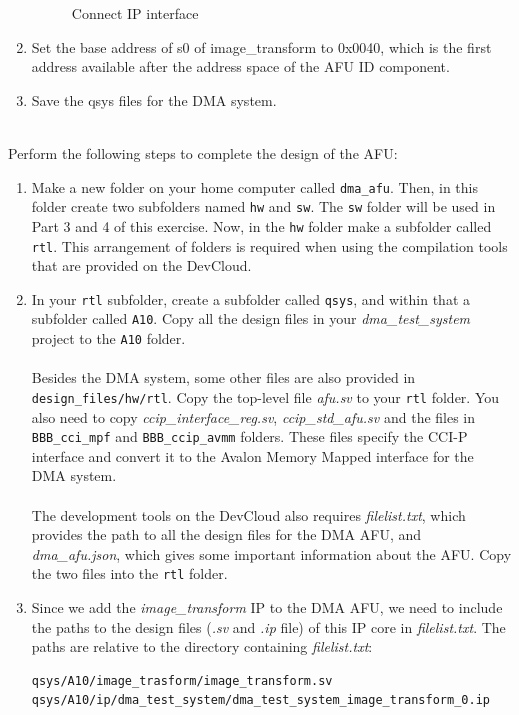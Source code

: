 \documentclass[epsfig,10pt,fullpage]{article}
\begin{document}
\begin{enumerate}
\begin{figure}
            \caption{Connect IP interface}
            \label{fig:ip_connect}
        \end{figure}
    \item Set the base address of s0 of image\_transform to 0x0040, which is the first address available after the address space of the AFU ID component. 
    \item Save the qsys files for the DMA system.
\end{enumerate}

~\\
\noindent
Perform the following steps to complete the design of the AFU:

\begin{enumerate}
\item
Make a new folder on your home computer called \texttt{dma\_afu}. Then, in this folder create two subfolders named \texttt{hw} and \texttt{sw}. The \texttt{sw} folder will be used in Part 3 and 4 of this exercise. Now, in the \texttt{hw} folder make a subfolder called \texttt{rtl}. This arrangement of folders is required when using the compilation tools that are provided on the DevCloud.
\item
In your \texttt{rtl} subfolder, create a subfolder called \texttt{qsys}, and within that a subfolder called \texttt{A10}. Copy all the design files in your \emph{dma\_test\_system} project to the \texttt{A10} folder. \\
\\
Besides the DMA system, some other files are also provided in \texttt{design\_files/hw/rtl}. Copy the top-level file \emph{afu.sv} to your \texttt{rtl} folder. You also need to copy \emph{ccip\_interface\_reg.sv}, \emph{ccip\_std\_afu.sv} and the files in \texttt{BBB\_cci\_mpf} and \texttt{BBB\_ccip\_avmm} folders. These files specify the CCI-P interface and convert it to the Avalon Memory Mapped interface for the DMA system.\\
\\
The development tools on the DevCloud also requires \emph{filelist.txt}, which provides the path to all the design files for the DMA AFU, and \emph{dma\_afu.json}, which gives some important information about the AFU. Copy the two files into the \texttt{rtl} folder.

\item
Since we add the \emph{image\_transform} IP to the DMA AFU, we need to include the paths to the design files (\emph{.sv} and \emph{.ip} file) of this IP core in \emph{filelist.txt}. The paths are relative to the directory containing \emph{filelist.txt}:
\begin{lstlisting}
qsys/A10/image_trasform/image_transform.sv
qsys/A10/ip/dma_test_system/dma_test_system_image_transform_0.ip
\end{lstlisting}


\end{enumerate}
\end{document}
